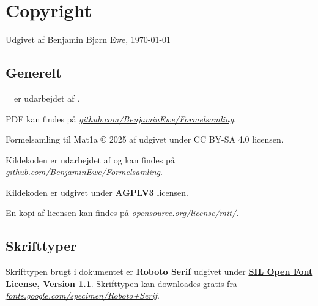 \section*{Copyright}

\begin{center}
    Udgivet af Benjamin Bjørn Ewe, \today
\end{center}

\subsection*{Generelt}
\doctitle\ \docversion\ er udarbejdet af \textbf{\docauthor}.

PDF kan findes på \href{https://github.com/BenjaminEwe/Formelsamling}{\emph{github.com/BenjaminEwe/Formelsamling}}.

Formelsamling til Mat1a © 2025 af \docauthor udgivet under CC BY-SA 4.0 licensen.

\hspace{1cm}

Kildekoden er udarbejdet af \textbf{\docauthor} og kan findes på \href{https://github.com/BenjaminEwe/Formelsamling}{\emph{github.com/BenjaminEwe/Formelsamling}}.

Kildekoden er udgivet under \textbf{AGPLV3} licensen.

En kopi af licensen kan findes på \href{https://opensource.org/license/mit/}{\emph{opensource.org/license/mit/}}.

\subsection*{Skrifttyper}
Skrifttypen brugt i dokumentet er \textbf{Roboto Serif} udgivet under \href{https://openfontlicense.org/open-font-license-official-text/}{\textbf{SIL Open Font License, Version 1.1}}. Skrifttypen kan downloades gratis fra \href{https://fonts.google.com/specimen/Roboto+Serif}{\emph{fonts.google.com/specimen/Roboto+Serif}}.

